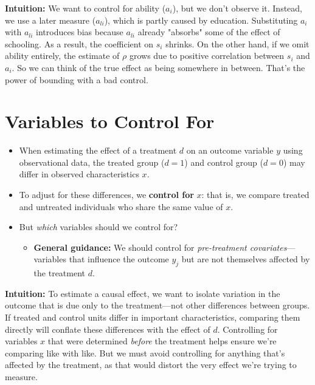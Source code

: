 \documentclass[12pt]{article}
\begin{document}
\textbf{Intuition:}  
We want to control for ability ($a_i$), but we don’t observe it. Instead, we use a later measure ($a_{li}$), which is partly caused by education. Substituting $a_i$ with $a_{li}$ introduces bias because $a_{li}$ already "absorbs" some of the effect of schooling. As a result, the coefficient on $s_i$ shrinks. On the other hand, if we omit ability entirely, the estimate of $\rho$ grows due to positive correlation between $s_i$ and $a_i$. So we can think of the true effect as being somewhere in between. That’s the power of bounding with a bad control.

\section*{\noindent\textbf{Variables to Control For}}

\begin{itemize}
  \item When estimating the effect of a treatment $d$ on an outcome variable $y$ using observational data, the treated group ($d = 1$) and control group ($d = 0$) may differ in observed characteristics $x$.

  \item To adjust for these differences, we \textbf{control for} $x$: that is, we compare treated and untreated individuals who share the same value of $x$.

  \item But \textit{which} variables should we control for?

  \begin{itemize}
    \item \textbf{General guidance:} We should control for \textit{pre-treatment covariates}—variables that influence the outcome $y_j$ but are not themselves affected by the treatment $d$.
  \end{itemize}
\end{itemize}

\textbf{Intuition:}  
To estimate a causal effect, we want to isolate variation in the outcome that is due only to the treatment—not other differences between groups. If treated and control units differ in important characteristics, comparing them directly will conflate these differences with the effect of $d$. Controlling for variables $x$ that were determined \textit{before} the treatment helps ensure we’re comparing like with like. But we must avoid controlling for anything that’s affected by the treatment, as that would distort the very effect we’re trying to measure.
\end{document}
